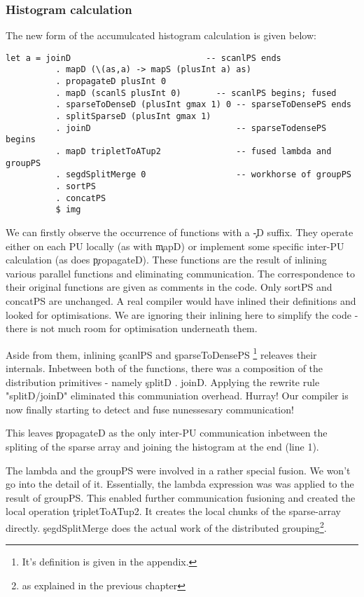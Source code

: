     \subsubsection{Histogram calculation}
      The new form of the accumulcated histogram calculation is given below:
      \begin{lstlisting}
let a = joinD                           -- scanlPS ends
          . mapD (\(as,a) -> mapS (plusInt a) as)
          . propagateD plusInt 0
          . mapD (scanlS plusInt 0)       -- scanlPS begins; fused
          . sparseToDenseD (plusInt gmax 1) 0 -- sparseToDensePS ends
          . splitSparseD (plusInt gmax 1)     
          . joinD                             -- sparseTodensePS begins
          . mapD tripletToATup2               -- fused lambda and groupPS 
          . segdSplitMerge 0                  -- workhorse of groupPS
          . sortPS
          . concatPS
          $ img
      \end{lstlisting}
      We can firstly observe the occurrence of functions with a \c{-D} suffix. They operate either
      on each PU locally (as with \c{mapD}) or implement some specific inter-PU calculation (as does \c{propagateD}).
      These functions are the result of inlining various parallel functions and eliminating communication.
      The correspondence to their original functions are given as comments in the code. Only sortPS and concatPS
      are unchanged. A real compiler would have inlined their definitions and looked for optimisations.
      We are ignoring their inlining here to simplify the code - there is not much room for optimisation underneath them.
      
      
      Aside from them, inlining \c{scanlPS} and \c{sparseToDensePS}
      \footnote{It's definition is given in the appendix.} releaves their internals.
      Inbetween both of the functions, there was a composition of the distribution primitives - namely \c{splitD . joinD}.
      Applying the rewrite rule "splitD/joinD" eliminated this communiation overhead. Hurray! Our compiler
      is now finally starting to detect and fuse nunessesary communication!
      
      This leaves \c{propagateD} as the only inter-PU communication inbetween the spliting of the
      sparse array and joining the histogram at the end (line 1).
      
      The lambda and the groupPS were involved in a rather special fusion. We won't
      go into the detail of it. Essentially, the lambda expression was
      was applied to the result of groupPS. This enabled further communication
      fusioning and created the local operation \c{tripletToATup2}. It creates the
      local chunks of the sparse-array directly. \c{segdSplitMerge} does the
      actual work of the distributed grouping\footnote{as explained in the previous chapter}.
      
